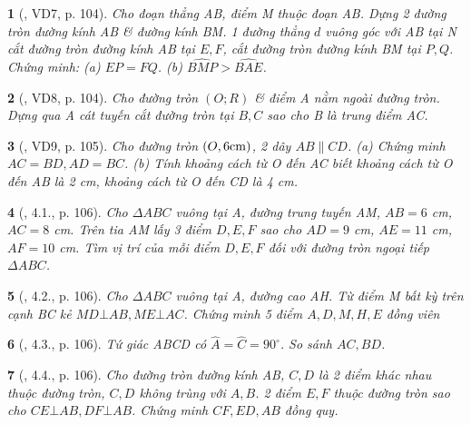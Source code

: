 \documentclass{article}
\newtheorem{baitoan}{}
\begin{document}
\begin{baitoan}[\cite{Binh_boi_duong_Toan_9_tap_1}, VD7, p. 104]
	Cho đoạn thẳng AB, điểm M thuộc đoạn AB. Dựng 2 đường tròn đường kính AB \& đường kính BM. 1 đường thẳng $d$ vuông góc với AB tại N cắt đường tròn đường kính AB tại $E,F$, cắt đường tròn đường kính BM tại $P,Q$. Chứng minh: (a) $EP = FQ$. (b) $\widehat{BMP} > \widehat{BAE}$.
\end{baitoan}

\begin{baitoan}[\cite{Binh_boi_duong_Toan_9_tap_1}, VD8, p. 104]
	Cho đường tròn $(O;R)$ \& điểm A nằm ngoài đường tròn. Dựng qua A cát tuyến cắt đường tròn tại $B,C$ sao cho B là trung điểm AC.
\end{baitoan}

\begin{baitoan}[\cite{Binh_boi_duong_Toan_9_tap_1}, VD9, p. 105]
	Cho đường tròn $(O,6{\rm cm})$, 2 dây $AB\parallel CD$. (a) Chứng minh $AC = BD,AD = BC$. (b) Tính khoảng cách từ O đến AC biết khoảng cách từ O đến AB là {\rm2 cm}, khoảng cách từ O đến CD là {\rm4 cm}.
\end{baitoan}

\begin{baitoan}[\cite{Binh_boi_duong_Toan_9_tap_1}, 4.1., p. 106]
	Cho $\Delta ABC$ vuông tại A, đường trung tuyến AM, $AB = 6$ {\rm cm}, $AC = 8$ {\rm cm}. Trên tia AM lấy 3 điểm $D,E,F$ sao cho $AD = 9$ {\rm cm}, $AE = 11$ {\rm cm}, $AF = 10$ {\rm cm}. Tìm vị trí của mỗi điểm $D,E,F$ đối với đường tròn ngoại tiếp $\Delta ABC$.
\end{baitoan}

\begin{baitoan}[\cite{Binh_boi_duong_Toan_9_tap_1}, 4.2., p. 106]
	Cho $\Delta ABC$ vuông tại A, đường cao AH. Từ điểm M bất kỳ trên cạnh BC kẻ $MD\bot AB,ME\bot AC$. Chứng minh 5 điểm $A,D,M,H,E$ đồng viên
\end{baitoan}

\begin{baitoan}[\cite{Binh_boi_duong_Toan_9_tap_1}, 4.3., p. 106]
	Tứ giác ABCD có $\widehat{A} = \widehat{C} = 90^\circ$. So sánh $AC,BD$.
\end{baitoan}

\begin{baitoan}[\cite{Binh_boi_duong_Toan_9_tap_1}, 4.4., p. 106]
	Cho đường tròn đường kính AB, $C,D$ là 2 điểm khác nhau thuộc đường tròn, $C,D$ không trùng với $A,B$. 2 điểm $E,F$ thuộc đường tròn sao cho $CE\bot AB,DF\bot AB$. Chứng minh $CF,ED,AB$ đồng quy.
\end{baitoan}
\end{document}

